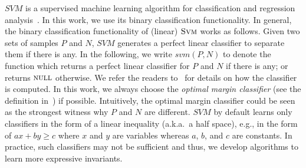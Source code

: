 

$\mathit{SVM}$ is a supervised machine learning algorithm for classification and regression analysis~\cite{svm:original}. In this work, we use its binary classification functionality.
In general, the binary classification functionality of (linear) $\textsc{Svm}$ works as follows.
Given two sets of samples $P$ and $N$, $\mathit{SVM}$ generates a perfect linear classifier to separate them if there is any.
In the following, we write $\mathit{svm}(P, N)$ to denote the function which returns a perfect linear classifier for $P$ and $N$ if there is any; or returns $\textsc{null}$ otherwise.
We refer the readers to~\cite{svm:smo} for details on how the classifier is computed.
In this work, we always choose the \textit{optimal margin classifier} (see the definition in~\cite{sharma2012interpolants}) if possible.
Intuitively, the optimal margin classifier could be seen as the strongest witness why $P$ and $N$ are different.
$\mathit{SVM}$ by default learns only classifiers in the form of a linear inequality (a.k.a.~a half space),
e.g., in the form of $\mathit{a x + b y \geq c}$ where $x$ and $y$ are variables whereas $a$, $b$, and $c$ are constants.
In practice, such classifiers may not be sufficient and thus, we develop algorithms to learn more expressive invariants.

